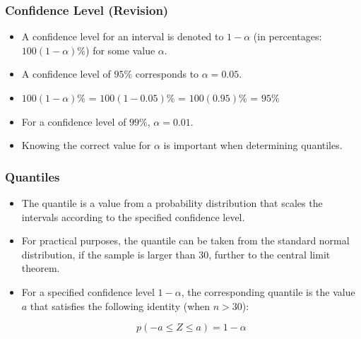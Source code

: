 \documentclass[a4]{beamer}
\begin{document}


\begin{frame}
\frametitle{Confidence Level (Revision) }

\begin{itemize}
\item A confidence level for an interval is denoted to $1-\alpha$ (in percentages: $100(1-\alpha)\%$) for some value $\alpha$.
\item A confidence level of $95\%$ corresponds to $\alpha = 0.05$.
\item $100(1-\alpha)\%$ = $100(1-0.05)\%$  = $100(0.95)\%$ = $95\%$
\item For a confidence level of $99\%$, $\alpha = 0.01$.
\item Knowing the correct value for $\alpha$ is important when determining quantiles.
\end{itemize}

\end{frame}
\begin{frame}
\frametitle{Quantiles }

\begin{itemize}
\item The quantile is a value from a probability distribution that scales the intervals according to the specified confidence level.
\item For practical purposes, the quantile can be taken from the standard normal distribution, if the sample is larger than 30, further to the central limit theorem.
\item For a specified confidence level $1-\alpha $, the corresponding quantile is the value $a$ that satisfies the following identity (when $n > 30$):

    \[ p( -a \leq Z \leq a) = 1- \alpha \]

\end{itemize}

\end{frame}
\end{document}
